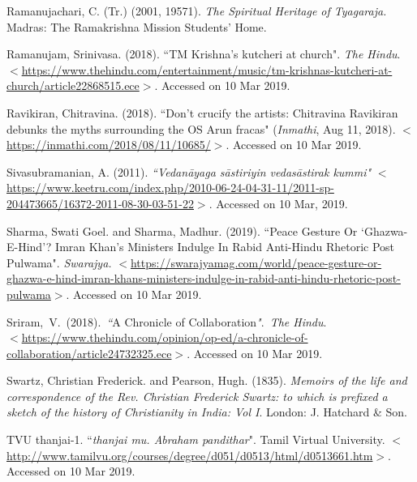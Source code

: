 \begin{thebibliography}{99}
  Ramanujachari, C. (Tr.) (2001, 19571). \textit{The Spiritual Heritage of Tyagaraja. }Madras: The Ramakrishna Mission Students' Home.

  Ramanujam, Srinivasa. (2018). ``TM Krishna's kutcheri at church". \textit{The Hindu}. $<$\url{https://www.thehindu.com/entertainment/music/tm-krishnas-kutcheri-at-church/article22868515.ece}$>$. Accessed on 10 Mar 2019.

  Ravikiran, Chitravina. (2018). ``Don't crucify the artists: Chitravina Ravikiran debunks the myths surrounding the OS Arun fracas" (\textit{Inmathi}, Aug 11, 2018).  $<$\url{https://inmathi.com/2018/08/11/10685/}$>$. Accessed on 10 Mar 2019.

  Sivasubramanian, A. (2011). \textit{``Vedanāyaga sāstiriyin vedasāstirak kummi"} $<$\url{https://www.keetru.com/index.php/2010-06-24-04-31-11/2011-sp-204473665/16372-2011-08-30-03-51-22}$>$. Accessed on 10 Mar, 2019.

  Sharma, Swati Goel. and Sharma, Madhur. (2019). ``Peace Gesture Or `Ghazwa-E-Hind'? Imran Khan's Ministers Indulge In Rabid Anti-Hindu Rhetoric Post Pulwama". \textit{Swarajya.} $<$\url{https://swarajyamag.com/world/peace-gesture-or-ghazwa-e-hind-imran-khans-ministers-indulge-in-rabid-anti-hindu-rhetoric-post-pulwama}$>$. Accessed on 10 Mar 2019.

  Sriram,~V.~(2018).~\textit{``}A Chronicle of Collaboration\textit{"}.~\textit{The Hindu}.\\ $<$\url{https://www.thehindu.com/opinion/op-ed/a-chronicle-of-collaboration/article24732325.ece}$>$. Accessed on 10 Mar 2019.

  Swartz, Christian Frederick. and Pearson, Hugh. (1835). \textit{Memoirs of the life and correspondence of the Rev. Christian Frederick Swartz: to which is prefixed a sketch of the history of Christianity in India: Vol I}. London: J. Hatchard \& Son.

  TVU thanjai-1. ``\textit{thanjai mu. Abraham pandithar}". Tamil Virtual University. $<$\url{http://www.tamilvu.org/courses/degree/d051/d0513/html/d0513661.htm}$>$. Accessed on 10 Mar 2019.

 \end{thebibliography}

\theendnotes
\label{endchapter5}



